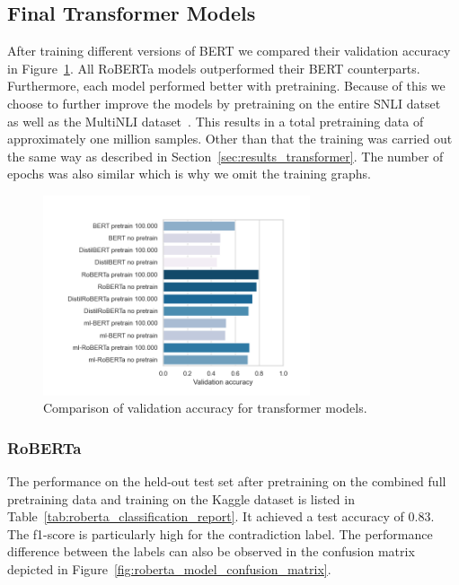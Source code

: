 \documentclass[acmsmall,nonacm]{acmart}
\begin{document}
\subsection{Final Transformer Models} \label{sec:result_final_transformer_models}
After training different versions of BERT we compared their validation accuracy in Figure~\ref{fig:transformer_comparison}. All RoBERTa models outperformed their BERT counterparts. Furthermore, each model performed better with pretraining. Because of this we choose to further improve the models by pretraining on the entire SNLI datset~\cite{snli-bowman2015} as well as the MultiNLI dataset~\cite{mlni-N18-1101}. This results in a total pretraining data of approximately one million samples. Other than that the training was carried out the same way as described in Section~\ref{sec:results_transformer}. The number of epochs was also similar which is why we omit the training graphs.

\begin{figure}[H]
  \includegraphics[width=0.7\textwidth]{assets/bert_roberta_comparison.png}
  \caption{Comparison of validation accuracy for transformer models.}
  \label{fig:transformer_comparison}
\end{figure}


\subsubsection{RoBERTa}
The performance on the held-out test set after pretraining on the combined full pretraining data and training on the Kaggle dataset is listed in Table~\ref{tab:roberta_classification_report}. It achieved a test accuracy of 0.83. The f1-score is particularly high for the contradiction label. The performance difference between the labels can also be observed in the confusion matrix depicted in Figure~\ref{fig:roberta_model_confusion_matrix}.
\end{document}
